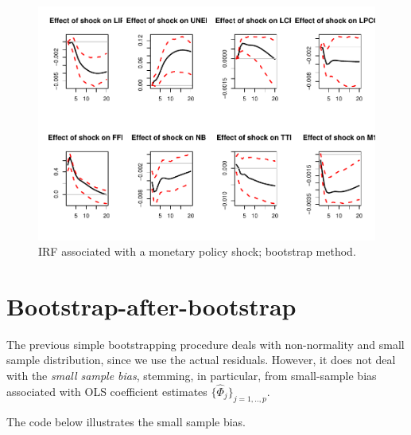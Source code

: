 \documentclass[
  12pt,
]{book}
\newenvironment{Shaded}{\begin{snugshade}}{\end{snugshade}}
\newcommand{\NormalTok}[1]{#1}
\newcommand{\OtherTok}[1]{\textcolor[rgb]{0.56,0.35,0.01}{#1}}
\newcommand{\SpecialCharTok}[1]{\textcolor[rgb]{0.81,0.36,0.00}{\textbf{#1}}}
\theoremstyle{definition}
\theoremstyle{definition}
\theoremstyle{definition}
\theoremstyle{definition}
\theoremstyle{remark}
\begin{document}
\begin{figure}
\includegraphics[width=0.95\linewidth]{IdentifStructShocks_files/figure-latex/inference2-1} \caption{IRF associated with a monetary policy shock; bootstrap method.}\label{fig:inference2}
\end{figure}

\begin{Shaded}
\end{Shaded}

\section{Bootstrap-after-bootstrap}\label{bootstrap-after-bootstrap}

The previous simple bootstrapping procedure deals with non-normality and small sample distribution, since we use the actual residuals. However, it does not deal with the \emph{small sample bias}, stemming, in particular, from small-sample bias associated with OLS coefficient estimates \(\{\widehat{\Phi}_j\}_{j=1,..,p}\).

The code below illustrates the small sample bias.
\end{document}
